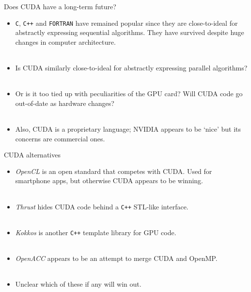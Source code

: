 \documentclass[usenames,dvipsnames]{beamer}
\begin{document}
\begin{frame}{Does CUDA have a long-term future?}
  \begin{block}{}
    \begin{itemize}
      \item{\texttt{C}, \texttt{C++} and \texttt{FORTRAN} have remained popular since they are close-to-ideal for abstractly expressing sequential algorithms. They have survived despite huge changes in computer architecture.}\\~\
      \item{Is CUDA similarly close-to-ideal for abstractly expressing parallel algorithms?}\\~\
      \item{Or is it too tied up with peculiarities of the GPU card? Will CUDA code go out-of-date as hardware changes?}\\~\
      \item{Also, CUDA is a proprietary language; NVIDIA appears to be `nice' but its concerns are commercial ones.}
    \end{itemize}
  \end{block}
\end{frame}

\begin{frame}{CUDA alternatives}
  \begin{block}{}
    \begin{itemize}
      \item{\textit{OpenCL} is an open standard that competes with CUDA. Used for smartphone apps, but otherwise CUDA appears to be winning.}\\~\
      \item{\textit{Thrust} hides CUDA code behind a \texttt{C++} STL-like interface.}\\~\
      \item{\textit{Kokkos} is another \texttt{C++} template library for GPU code.}\\~\
      \item{\textit{OpenACC} appears to be an attempt to merge CUDA and OpenMP.}\\~\
      \item{Unclear which of these if any will win out.}
    \end{itemize}
  \end{block}
\end{frame}
\end{document}
